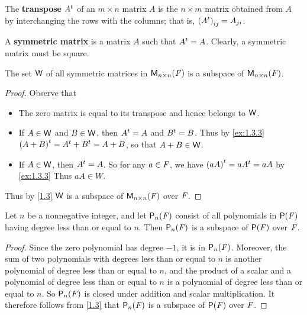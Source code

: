 \begin{defn}\label{1.3.3}
  The \textbf{transpose} \({A}^{t}\) of an \(m \times n\) matrix \(A\) is the \(n \times m\) matrix obtained from \(A\) by interchanging the rows with the columns;
  that is, \(\left\lparen{A}^{t}\right\rparen_{i j} = A_{j i}\).
\end{defn}

\begin{defn}\label{1.3.4}
  A \textbf{symmetric matrix} is a matrix \(A\) such that \({A}^{t} = A\).
  Clearly, a symmetric matrix must be square.
\end{defn}

\begin{eg}\label{1.3.5}
  The set \(\mathsf{W}\) of all symmetric matrices in \(\mathsf{M}_{{n} \times n}({\mathit{F}})\) is a subspace of \(\mathsf{M}_{{n} \times n}({\mathit{F}})\).
\end{eg}

\begin{proof}
  Observe that
  \begin{itemize}
    \item The zero matrix is equal to its transpose and hence belongs to \(\mathsf{W}\).
    \item If \(A \in \mathsf{W}\) and \(B \in \mathsf{W}\), then \({A}^{t} = A\) and \({B}^{t} = B\).
          Thus by \cref{ex:1.3.3} \({\left\lparen A + B\right\rparen}^{t} = {A}^{t} + {B}^{t} = A + B\), so that \(A + B \in \mathsf{W}\).
    \item If \(A \in \mathsf{W}\), then \({A}^{t} = A\).
          So for any \(a \in \mathit{F}\), we have \({\left\lparen aA\right\rparen}^{t} = a{A}^{t} = aA\) by \cref{ex:1.3.3}
          Thus \(aA \in W\).
  \end{itemize}
  Thus by \cref{1.3} \(\mathsf{W}\) is a subspace of \(\mathsf{M}_{{n} \times n}({\mathit{F}})\) over \(\mathit{F}\).
\end{proof}

\begin{eg}\label{1.3.6}
  Let \(n\) be a nonnegative integer, and let \(\ps[n]{\F}\) consist of all polynomials in \(\ps{\F}\) having degree less than or equal to \(n\).
  Then \(\ps[n]{\F}\) is a subspace of \(\ps{\F}\) over \(\mathit{F}\).
\end{eg}

\begin{proof}
  Since the zero polynomial has degree \(-1\), it is in \(\ps[n]{\F}\).
  Moreover, the sum of two polynomials with degrees less than or equal to \(n\) is another polynomial of degree less than or equal to \(n\), and the product of a scalar and a polynomial of degree less than or equal to \(n\) is a polynomial of degree less than or equal to \(n\).
  So \(\ps[n]{\F}\) is closed under addition and scalar multiplication.
  It therefore follows from \cref{1.3} that \(\ps[n]{\F}\) is a subspace of \(\ps{\F}\) over \(\mathit{F}\).
\end{proof}


